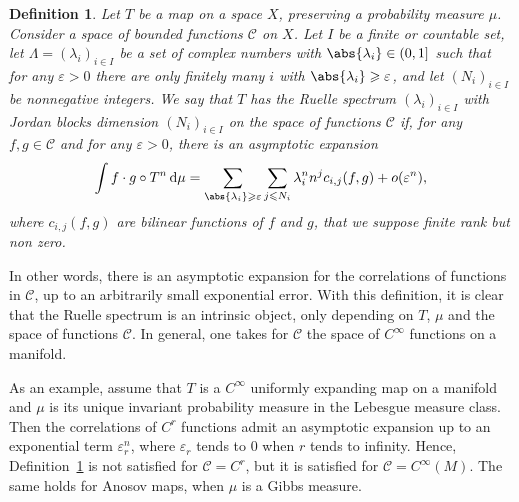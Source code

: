 \documentclass[11pt, a4paper, oneside, final, pagebackref]{amsart}
\newcommand{\boC}{\mathcal{C}}
\newcommand{\dd}{\mathop{}\!\mathrm{d}}
\renewcommand{\epsilon}{\varepsilon}
\renewcommand{\leq}{\leqslant}
\renewcommand{\geq}{\geqslant}
\newtheorem{definition}[thm]{Definition}
\theoremstyle{definition}
\numberwithin{equation}{section}
\begin{document}
\begin{definition}
\label{defn:Ruelle_spectrum} Let $T$ be a map on a space $X$, preserving a
probability measure $\mu$. Consider a space of bounded functions $\boC$ on
$X$. Let $I$ be a finite or countable set, let $\Lambda = (\lambda_i)_{i \in
I}$ be a set of complex numbers with $\abs{\lambda_i} \in (0,1]$ such that
for any $\epsilon>0$ there are only finitely many $i$ with $\abs{\lambda_i}
\geq \epsilon$, and let $(N_i)_{i\in I}$ be nonnegative integers. We say that
$T$ has the Ruelle spectrum $(\lambda_i)_{i \in I}$ with Jordan blocks
dimension $(N_i)_{i\in I}$ on the space of functions $\boC$ if, for any $f, g
\in \boC$ and for any $\epsilon>0$, there is an asymptotic expansion
\begin{equation*}
  \int f \cdot g \circ T^n \dd\mu = \sum_{\abs{\lambda_i} \geq \epsilon} \sum_{j\leq N_i} \lambda_i^n n^j c_{i,j}(f,g)
  + o(\epsilon^n),
\end{equation*}
where $c_{i,j}(f,g)$ are bilinear functions of  $f$ and $g$, that we suppose finite rank but non zero.
\end{definition}

In other words, there is an asymptotic expansion for the correlations of
functions in $\boC$, up to an arbitrarily small exponential error. With this
definition, it is clear that the Ruelle spectrum is an intrinsic object, only
depending on $T$, $\mu$ and the space of functions $\boC$. In general, one
takes for $\boC$ the space of $C^\infty$ functions on a manifold.

As an example, assume that $T$ is a $C^\infty$ uniformly expanding map on a
manifold and $\mu$ is its unique invariant probability measure in the
Lebesgue measure class. Then the correlations of $C^r$ functions admit an
asymptotic expansion up to an exponential term $\epsilon_r^n$, where
$\epsilon_r$ tends to $0$ when $r$ tends to infinity. Hence,
Definition~\ref{defn:Ruelle_spectrum} is not satisfied for $\boC = C^r$, but
it is satisfied for $\boC = C^\infty(M)$. The same holds for Anosov maps,
when $\mu$ is a Gibbs measure.

\medskip
\end{document}
